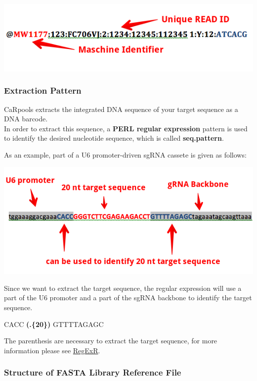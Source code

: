 \documentclass[]{article}
\begin{document}
\includegraphics{./pictures/fastq-format-example.png}

\subsubsection{Extraction Pattern}\label{extraction-pattern}

CaRpools extracts the integrated DNA sequence of your target sequence as
a DNA barcode.\\
In order to extract this sequence, a \textbf{PERL regular expression}
pattern is used to identify the desired nucleotide sequence, which is
called \textbf{seq.pattern}.

As an example, part of a U6 promoter-driven sgRNA cassete is given as
follows:

\includegraphics{./pictures/extraction.png}

Since we want to extract the target sequence, the regular expression
will use a part of the U6 promoter and a part of the sgRNA backbone to
identify the target sequence.

CACC \textbf{(.\{20\})} GTTTTAGAGC

The parenthesis are necessary to extract the target sequence, for more
information please see \href{http://www.regexr.com/}{RegExR}.

\subsubsection{Structure of FASTA Library Reference
File}\label{structure-of-fasta-library-reference-file}
\end{document}
